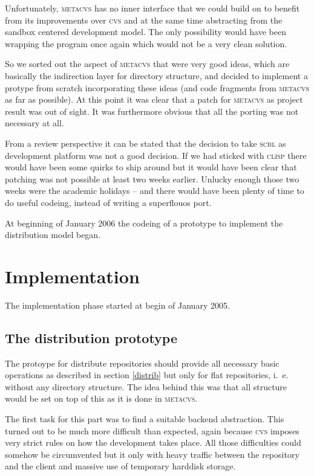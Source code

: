 \documentclass[fleqn, 10pt, a4paper]{report} \usepackage{amssymb}
\begin{document}
Unfortunately, \textsc{metacvs} has no inner interface that we could
build on to benefit from its improvements over \textsc{cvs} and at the
same time abstracting from the sandbox centered development model. The
only possibility would have been wrapping the program once again which
would not be a very clean solution.

So we sorted out the aspect of \textsc{metacvs} that were very good
ideas, which are basically the indirection layer for directory
structure, and decided to implement a protype from scratch
incorporating these ideas (and code fragments from \textsc{metacvs} as
far as possible). At this point it was clear that a patch for
\textsc{metacvs} as project result was out of sight. It was
furthermore obvious that all the porting was not necessary at all.

From a review perspective it can be stated that the decision to take
\textsc{scbl} as development platform was not a good decision. If we
had sticked with \textsc{clisp} there would have been some quirks to
ship around but it would have been clear that patching was not
possible at least two weeks earlier. Unlucky enough those two weeks
were the academic holidays -- and there would have been plenty of time
to do useful codeing, instead of writing a superflouos port.

At beginning of January 2006 the codeing of a prototype to implement
the distribution model began.

\section{Implementation}

The implementation phase started at begin of January 2005.

\subsection{The distribution prototype}

The protoype for distribute repositories should provide all necessary
basic operations as described in section \ref{distrib} but only for
flat repositories, i.~e. without any directory structure. The idea
behind this was that all structure would be set on top of this as it
is done in \textsc{metacvs}.

The first task for this part was to find a suitable backend
abstraction. This turned out to be much more difficult than expected,
again because \textsc{cvs} imposes very strict rules on how the
development takes place. All those difficulties could somehow be
circumvented but it only with heavy traffic between the repository and
the client and massive use of temporary harddisk storage.
\end{document}
